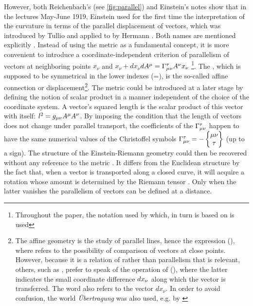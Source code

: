 \documentclass[final]{article}
\newcommand{\xdx}{\ensuremath{x_\nu} and \ensuremath{x_\nu + dx_\nu}\xspace}
\begin{document}
However, both Reichenbach's (see \cref{fig:parallel}) and Einstein's notes show that in the lectures May-June 1919, Einstein used for the first time the interpretation of the curvature in terms of the parallel displacement of vectors, which was introduced by Tullio \citet{Levi-Civita1916} and applied to \rt by Hermann \citet{Weyl1918}. Both names are mentioned explicitly \citep[028-01-03, 33]{HR}. Instead of using the metric as a fundamental concept, it is more convenient to introduce a coordinate-independent criterion of parallelism of vectors at neighboring points \xdx $dA^\mu=\Gamma^\tau_{\mu\nu} A^\nu x_\nu$ \citep[028-01-03, 33]{HR}\footnote{Throughout the paper, the notation used by \citet{Reichenbach1928} which, in turn is based on \citet{Eddington1923,Eddington1925} is used}. The \Gtmn, which is supposed to be symmetrical in the lower indexes (\Gtmn=\Gtmn), is the so-called affine connection or displacement\footnote{The affine geometry is the study of parallel lines, \citet{Weyl1918b} hence the expression  (), where  refers to the possibility of comparison of vectors at close points. However, because it is a relation of  rather than parallelism that is relevant, others, such as \citet{Reichenbach1928a}, prefer to speak of the operation of  (), where the latter indicates the small coordinate difference $dx_{\nu}$ along which the vector is transferred. The word  also refers to the vector $dx_\nu$. In order to avoid confusion, the world  \textit{Übertragung} was also used, e.g. by \citet{Schouten1922}}. The metric could be introduced at a later stage by defining the notion of scalar product in a manner independent of the choice of the coordinate system. A vector's squared length is the scalar product of this vector with itself: $l^2=g_{\mu\nu} A^\mu A^\nu$. By imposing the condition that the length of vectors does not change under parallel transport, the coefficients of the $\Gamma^\tau_{\mu\nu}$ happen to have the same numerical values of the Christoffel symbols $\Gamma^\tau_{\mu\nu} = - \begin{Bmatrix} \mu \nu \\ \tau \end{Bmatrix}$ (up to a sign). The structure of the Einstein-Riemann geometry could then be recovered without any reference to the metric \gmn. It differs from the Euclidean structure by the fact that, when a vector is transported along a closed curve, it will acquire a rotation whose amount is determined by the Riemann tensor \riteg. Only when the latter vanishes the parallelism of vectors can be defined at a distance.
\end{document}

